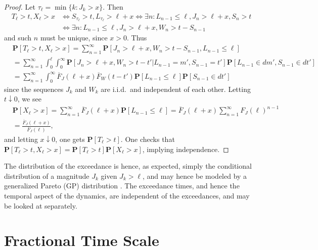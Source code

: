 \documentclass[12pt]{article}
\theoremstyle{definition}
\theoremstyle{remark}
\numberwithin{equation}{section}
\newcommand{\pr}{\mathbf {P}}
\newcommand{\1}{\mathbf 1}
\begin{document}
\begin{proof}
Let $\tau_\ell = \min\{k: J_k > x\}$. Then
\begin{align*}
T_\ell > t, X_\ell > x 
&\Longleftrightarrow
S_{\tau_\ell} > t, L_{\tau_\ell} > \ell + x
\Longleftrightarrow
\exists n: L_{n-1} \le \ell, J_n > \ell + x, S_n > t
\\
&\Longleftrightarrow
\exists n: L_{n-1} \le \ell, J_n > \ell + x, W_n > t - S_{n-1}
\end{align*}
and such $n$ must be unique, since $x > 0$.
Thus 
\begin{align*}
&\pr[T_\ell > t, X_\ell > x]
= \sum_{n=1}^\infty \pr[J_n > \ell + x, W_n > t - S_{n-1}, L_{n-1} \le \ell]
\\
&= \sum_{n=1}^\infty \int_0^\ell \int_0^\infty \pr[J_n > \ell + x, W_n > t - t' | L_{n-1} = m', 
S_{n-1} = t'] \pr[L_{n-1} \in dm', S_{n-1} \in dt']
\\
&= \sum_{n=1}^\infty \int_0^\infty \overline F_J(\ell + x) \overline F_W(t - t')
\pr[L_{n-1} \le \ell] \pr[S_{n-1} \in dt']
\end{align*}
since the sequences $J_k$ and $W_k$ are i.i.d.\ and independent of each other.
Letting $t \downarrow 0$, we see
\begin{align*}
&\pr[X_\ell > x] 
= \sum_{n=1}^\infty \overline F_J(\ell+x) \pr[L_{n-1} \le \ell] 
= \overline F_J(\ell+x) \sum_{n=1}^\infty F_J(\ell)^{n-1}
\\
&= \frac{\overline F_J(\ell + x)}{\overline F_J(\ell)},
\end{align*}
and letting $x \downarrow 0$, one gets $\pr[T_\ell > t]$. 
One checks that $\pr[T_\ell > t, X_\ell > x] = \pr[T_\ell > t] \pr[X_\ell > x]$, implying independence.
\end{proof}
The distribution of the exceedance is hence, as expected, simply the
conditional distribution of a magnitude $J_k$ given $J_k > \ell$,
and may hence be modeled by a generalized Pareto (GP) distribution
\cite{ColesBook}. The exceedance times, and hence the temporal aspect of the
dynamics, are independent of the exceedances, and may be looked at separately.

\section{Fractional Time Scale}
\end{document}
